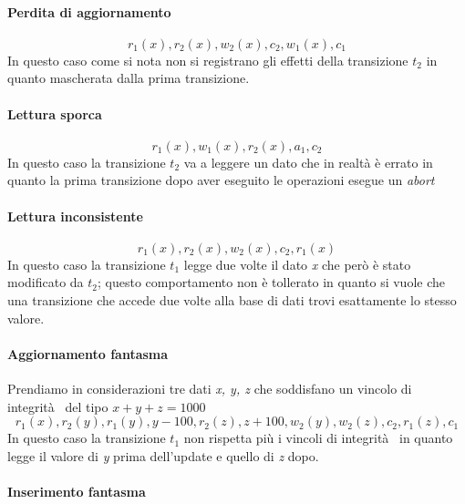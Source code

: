 \paragraph{Perdita di aggiornamento}
$$r_1(x),r_2(x),w_2(x),c_2,w_1(x),c_1$$
In questo caso come si nota non si registrano gli effetti della transizione $t_2$ in quanto mascherata dalla prima transizione.
\paragraph{Lettura sporca}
$$r_1(x),w_1(x),r_2(x),a_1,c_2$$
In questo caso la transizione $t_2$ va a leggere un dato che in realtà è errato in quanto la prima transizione dopo aver eseguito le operazioni esegue un \emph{abort}
\paragraph{Lettura inconsistente}
$$r_1(x),r_2(x),w_2(x),c_2,r_1(x)$$
In questo caso la transizione $t_1$ legge due volte il dato \emph{x} che però è stato modificato da $t_2$; questo comportamento non è tollerato in quanto si vuole che una transizione che accede due volte alla base di dati trovi esattamente lo stesso valore.
\paragraph{Aggiornamento fantasma} Prendiamo in considerazioni tre dati \emph{x, y, z} che soddisfano un vincolo di integrità  del tipo $x+y+z=1000$
$$r_1(x),r_2(y),r_1(y),y-100,r_2(z),z+100,w_2(y),w_2(z),c_2,r_1(z),c_1$$
In questo caso la transizione $t_1$ non rispetta più i vincoli di integrità  in quanto legge il valore di \emph{y} prima dell'update e quello di \emph{z} dopo.
\paragraph{Inserimento fantasma}
